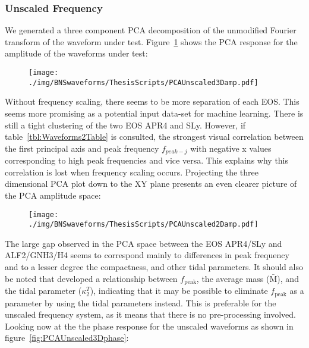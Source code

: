 \subsubsection{Unscaled Frequency}
\label{sec:PCAUnscaled}
We generated a three component PCA decomposition of the unmodified Fourier transform of the waveform under test. Figure~\ref{fig:PCAUnscaled3Damp} shows the PCA response for the amplitude of the waveforms under test: 
\begin{figure}[H]
	\centering
	\texttt{[image: ./img/BNSwaveforms/ThesisScripts/PCAUnscaled3Damp.pdf]} 
	\caption[\protect]{\protect}
	\label{fig:PCAUnscaled3Damp}
\end{figure}
Without frequency scaling, there seems to be more separation of each EOS. This seems more promising as a potential input data-set for machine learning. There is still a tight clustering of the two EOS APR4 and SLy. However, if table~\ref{tbl:Waveforms2Table} is consulted, the strongest visual correlation between the first principal axis and peak frequency $f_{peak-j}$ with negative x values corresponding to high peak frequencies and vice versa.  This explains why this correlation is lost when frequency scaling occurs. Projecting the three dimensional PCA plot  down to the XY plane presents an even clearer picture of the PCA amplitude space:
\begin{figure}[H]
	\centering
	\texttt{[image: ./img/BNSwaveforms/ThesisScripts/PCAUnscaled2Damp.pdf]} 
	\caption[\protect]{\protect}
	\label{fig:PCAUnscaled2Damp}
\end{figure}
The large gap observed in the PCA space between the EOS APR4/SLy and ALF2/GNH3/H4 seems to correspond mainly to differences in peak frequency and to a lesser degree the compactness, and other tidal parameters. It should also be noted that \cite{Bernuzzi2015} developed a relationship between $f_{\text{peak}}$, the average mass ($\bar{\text{M}}$), and the tidal parameter ($\kappa^T_2$), indicating that it may be possible to eliminate $f_{\text{peak}}$ as a parameter by using the tidal parameters instead. This is preferable for the unscaled frequency system, as it means that there is no pre-processing involved. Looking now at the  the phase response for the unscaled waveforms as shown in figure~\ref{fig:PCAUnscaled3Dphase}:
